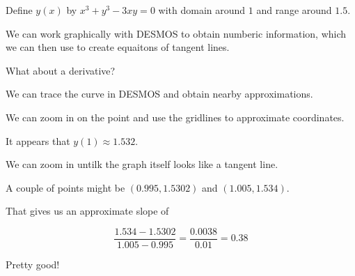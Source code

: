 \documentclass{ximera}
\begin{document}
\begin{example}

Define $y(x)$ by $x^3 + y^3 - 3 x y = 0$ with domain around $1$ and range around $1.5$.


We can work graphically with DESMOS to obtain numberic information, which we can then use to create equaitons of tangent lines.







\begin{center}
\end{center}



What about a derivative?

We can trace the curve in DESMOS and obtain nearby approximations.


We can zoom in on the point and use the gridlines to approximate coordinates.






\begin{center}
\end{center}

It appears that $y(1) \approx 1.532$.



We can zoom in untilk the graph itself looks like a tangent line.



\begin{center}
\end{center}

A couple of points might be $(0.995, 1.5302)$ and $(1.005, 1.534)$.

That gives us an approximate slope of 

\[
\frac{1.534 - 1.5302}{1.005 - 0.995} = \frac{0.0038}{0.01} = 0.38
\]


Pretty good!


\end{example}
\end{document}
